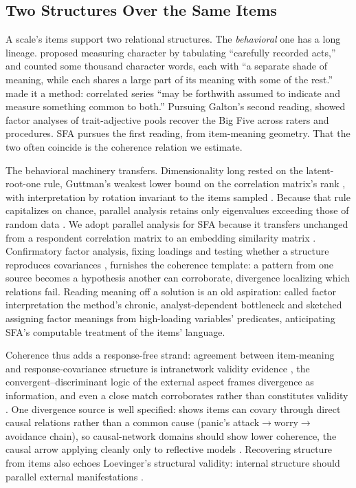 \subsection{Two Structures Over the Same Items}

A scale's items support two relational structures. The \emph{behavioral} one has
a long lineage. \citet{galton-1884} proposed measuring character by tabulating
``carefully recorded acts,'' and counted some thousand character words, each with
``a separate shade of meaning, while each shares a large part of its meaning with
some of the rest.'' \citet{spearman-1904} made it a method: correlated series
``may be forthwith assumed to indicate and measure something common to both.''
Pursuing Galton's second reading, \citet{goldberg-1990} showed factor analyses of
trait-adjective pools recover the Big Five across raters and procedures. SFA pursues
the first reading, from item-meaning geometry. That the two often coincide is the
coherence relation we estimate.

The behavioral machinery transfers. Dimensionality long rested on the
latent-root-one rule, Guttman's weakest lower bound on the correlation matrix's
rank \citep{kaiser-1960}, with interpretation by rotation invariant to the items
sampled \citep{kaiser-1958}. Because that rule capitalizes on chance, parallel
analysis retains only eigenvalues exceeding those of random data \citep{horn-1965}.
We adopt parallel analysis for SFA because it transfers unchanged from a respondent
correlation matrix to an embedding similarity matrix \citep{horn-1965}.
Confirmatory factor analysis, fixing loadings and testing whether a structure
reproduces covariances \citep{joreskog-1969}, furnishes the coherence template: a
pattern from one source becomes a hypothesis another can corroborate, divergence
localizing which relations fail. Reading meaning off a solution is an old
aspiration: \citet{lara-etal-1992} called factor interpretation the method's
chronic, analyst-dependent bottleneck and sketched assigning factor meanings from
high-loading variables' predicates, anticipating SFA's computable treatment of the
items' language.

Coherence thus adds a response-free strand: agreement between item-meaning and
response-covariance structure is intranetwork validity evidence
\citep{cronbach-meehl-1955}, the convergent--discriminant logic of the external
aspect \citep{messick-1995} frames divergence as information, and even a close match
corroborates rather than constitutes validity \citep{borsboom-etal-2004}. One
divergence source is well specified:
\citet{borsboom-2008} shows items can covary through direct causal relations rather
than a common cause (panic's attack$\rightarrow$worry$\rightarrow$avoidance chain),
so causal-network domains should show lower coherence, the causal arrow applying
cleanly only to reflective models \citep{borsboom-etal-2004}. Recovering structure
from items also echoes Loevinger's structural validity: internal structure should
parallel external manifestations \citep{clark-watson-2019}.
